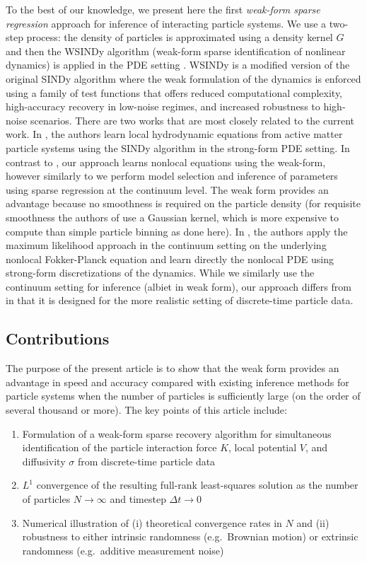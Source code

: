 \documentclass[english,reqno]{amsart}
\begin{document}
To the best of our knowledge, we present here the first {\it weak-form sparse regression} approach for inference of interacting particle systems. We use a two-step process: the density of particles is approximated using a density kernel $G$ and then the WSINDy algorithm (weak-form sparse identification of nonlinear dynamics) is applied in the PDE setting \cite{messenger2020weak,messenger2020weakpde}. WSINDy is a modified version of the original SINDy algorithm \cite{brunton2016discovering,rudy2017data} where the weak formulation of the dynamics is enforced using a family of test functions that offers reduced computational complexity, high-accuracy recovery in low-noise regimes, and increased robustness to high-noise scenarios. There are two works that are most closely related to the current work. In \cite{supekar2021learning}, the authors learn local hydrodynamic equations from active matter particle systems using the SINDy algorithm in the strong-form PDE setting. In contrast to \cite{supekar2021learning}, our approach learns nonlocal equations using the weak-form, however similarly to \cite{supekar2021learning} we perform model selection and inference of parameters using sparse regression at the continuum level. The weak form provides an advantage because no smoothness is required on the particle density (for requisite smoothness the authors of \cite{supekar2021learning} use a Gaussian kernel, which is more expensive to compute than simple particle binning as done here). In \cite{lang2020learning}, the authors apply the maximum likelihood approach in the continuum setting on the underlying nonlocal Fokker-Planck equation and learn directly the nonlocal PDE using strong-form discretizations of the dynamics. While we similarly use the continuum setting for inference (albiet in weak form), our approach differs from \cite{lang2020learning} in that it is designed for the more realistic setting of discrete-time particle data.

\subsection{Contributions}

The purpose of the present article is to show that the weak form provides an advantage in speed and accuracy compared with existing inference methods for particle systems when the number of particles is sufficiently large (on the order of several thousand or more). The key points of this article include:
\begin{enumerate}[label=(\Roman*)]
\item Formulation of a weak-form sparse recovery algorithm for simultaneous identification of the particle interaction force $K$, local potential $V$, and diffusivity $\sigma$ from discrete-time particle data 
\item $L^1$ convergence of the resulting full-rank least-squares solution as the number of particles $N\to \infty$ and timestep $\Delta t\to 0$
\item Numerical illustration of (i) theoretical convergence rates in $N$ and (ii) robustness to either intrinsic randomness (e.g.\ Brownian motion) or extrinsic randomness (e.g.\ additive measurement noise)
\end{enumerate}
\end{document}

